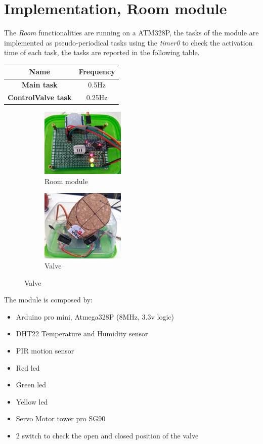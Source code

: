 \section{Implementation, Room module}
The \textit{Room} functionalities are running on a ATM328P, the tasks of the module are implemented as pseudo-periodical tasks using the \textit{timer0} 
to check the activation time of each task, the tasks are reported in the following table.

\begin{center}
	\begin{tabular}{||c | c ||} 
		\hline
		Name 	& Frequency \\ 
		\hline
		\textbf{Main task}			&	0.5Hz \\ 
		\hline
		\textbf{ControlValve task}	&	0.25Hz \\ 
		\hline
	\end{tabular}
	\label{tab:Room_Tasks}
\end{center}

\begin{figure}[h]
	\centering
	\begin{subfigure}{0.4\textwidth} %
		\includegraphics[width=4cm,keepaspectratio]{img/room_board}
		\caption{Room module}
		\label{fig:room_module}
		\end{subfigure}
	\vspace{1em} %
	\begin{subfigure}{0.4\textwidth} %
		\includegraphics[width=4cm,keepaspectratio]{img/valve}
		\caption{Valve}
		\label{fig:valve}
	\end{subfigure}
\end{figure}


The module is composed by:
\begin{itemize}
	\item Arduino pro mini, Atmega328P (8MHz, 3.3v logic)
	\item DHT22 Temperature and Humidity sensor
	\item PIR motion sensor
	\item Red led
	\item Green led
	\item Yellow led
	\item Servo Motor tower pro SG90
	\item 2 switch to check the open and closed position of the valve
\end{itemize}


